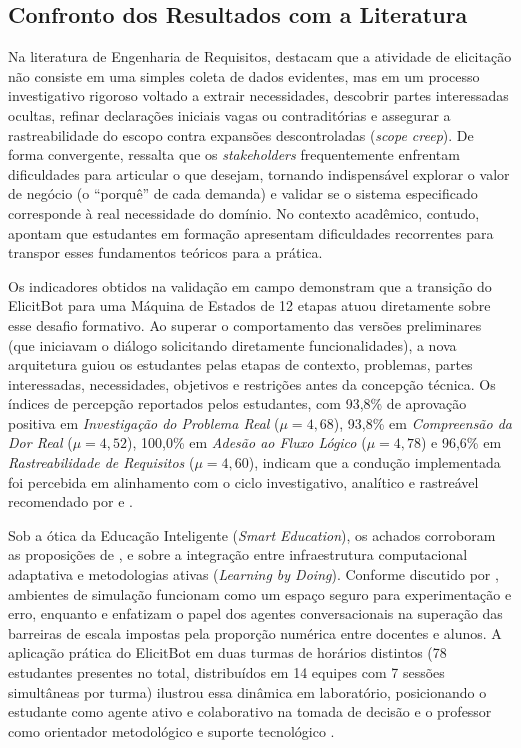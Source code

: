\subsection{Confronto dos Resultados com a Literatura}

Na literatura de Engenharia de Requisitos,  destacam que a atividade de elicitação não consiste em uma simples coleta de dados evidentes, mas em um processo investigativo rigoroso voltado a extrair necessidades, descobrir partes interessadas ocultas, refinar declarações iniciais vagas ou contraditórias e assegurar a rastreabilidade do escopo contra expansões descontroladas (\textit{scope creep}). De forma convergente,  ressalta que os \textit{stakeholders} frequentemente enfrentam dificuldades para articular o que desejam, tornando indispensável explorar o valor de negócio (o ``porquê'' de cada demanda) e validar se o sistema especificado corresponde à real necessidade do domínio. No contexto acadêmico, contudo,  apontam que estudantes em formação apresentam dificuldades recorrentes para transpor esses fundamentos teóricos para a prática.

Os indicadores obtidos na validação em campo demonstram que a transição do ElicitBot para uma Máquina de Estados de 12 etapas atuou diretamente sobre esse desafio formativo. Ao superar o comportamento das versões preliminares (que iniciavam o diálogo solicitando diretamente funcionalidades), a nova arquitetura guiou os estudantes pelas etapas de contexto, problemas, partes interessadas, necessidades, objetivos e restrições antes da concepção técnica. Os índices de percepção reportados pelos estudantes, com 93,8\% de aprovação positiva em \textit{Investigação do Problema Real} ($\mu = 4,68$), 93,8\% em \textit{Compreensão da Dor Real} ($\mu = 4,52$), 100,0\% em \textit{Adesão ao Fluxo Lógico} ($\mu = 4,78$) e 96,6\% em \textit{Rastreabilidade de Requisitos} ($\mu = 4,60$), indicam que a condução implementada foi percebida em alinhamento com o ciclo investigativo, analítico e rastreável recomendado por  e .

Sob a ótica da Educação Inteligente (\textit{Smart Education}), os achados corroboram as proposições de ,  e  sobre a integração entre infraestrutura computacional adaptativa e metodologias ativas (\textit{Learning by Doing}). Conforme discutido por , ambientes de simulação funcionam como um espaço seguro para experimentação e erro, enquanto  e  enfatizam o papel dos agentes conversacionais na superação das barreiras de escala impostas pela proporção numérica entre docentes e alunos. A aplicação prática do ElicitBot em duas turmas de horários distintos (78 estudantes presentes no total, distribuídos em 14 equipes com 7 sessões simultâneas por turma) ilustrou essa dinâmica em laboratório, posicionando o estudante como agente ativo e colaborativo na tomada de decisão e o professor como orientador metodológico e suporte tecnológico \cite{demir2021}.

